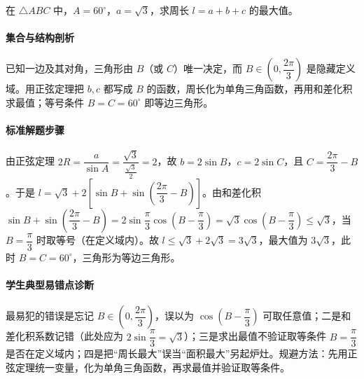 \begin{problem}
在 $\triangle ABC$ 中，$A=60^\circ$，$a=\sqrt3$，求周长 $l=a+b+c$ 的最大值。
\end{problem}
\begin{solution}
\paragraph{集合与结构剖析}
已知一边及其对角，三角形由 $B$（或 $C$）唯一决定，而 $B\in\left(0,\dfrac{2\pi}{3}\right)$ 是隐藏定义域。用正弦定理把 $b,c$ 都写成 $B$ 的函数，周长化为单角三角函数，再用和差化积求最值；等号条件 $B=C=60^\circ$ 即等边三角形。
\paragraph{标准解题步骤}
由正弦定理 $2R=\dfrac{a}{\sin A}=\dfrac{\sqrt3}{\frac{\sqrt3}{2}}=2$，故 $b=2\sin B$，$c=2\sin C$，且 $C=\dfrac{2\pi}{3}-B$。于是 $l=\sqrt3+2\left[\sin B+\sin\left(\dfrac{2\pi}{3}-B\right)\right]$。由和差化积 $\sin B+\sin\left(\dfrac{2\pi}{3}-B\right)=2\sin\dfrac{\pi}{3}\cos\left(B-\dfrac{\pi}{3}\right)=\sqrt3\cos\left(B-\dfrac{\pi}{3}\right)\leq\sqrt3$，当 $B=\dfrac{\pi}{3}$ 时取等号（在定义域内）。故 $l\leq\sqrt3+2\sqrt3=3\sqrt3$，最大值为 $3\sqrt3$，此时 $B=C=60^\circ$，三角形为等边三角形。
\paragraph{学生典型易错点诊断}
最易犯的错误是忘记 $B\in\left(0,\dfrac{2\pi}{3}\right)$，误以为 $\cos\left(B-\dfrac{\pi}{3}\right)$ 可取任意值；二是和差化积系数记错（此处应为 $2\sin\dfrac{\pi}{3}=\sqrt3$）；三是求出最值不验证取等条件 $B=\dfrac{\pi}{3}$ 是否在定义域内；四是把“周长最大”误当“面积最大”另起炉灶。规避方法：先用正弦定理统一变量，化为单角三角函数，再求最值并验证取等条件。
\end{solution}

